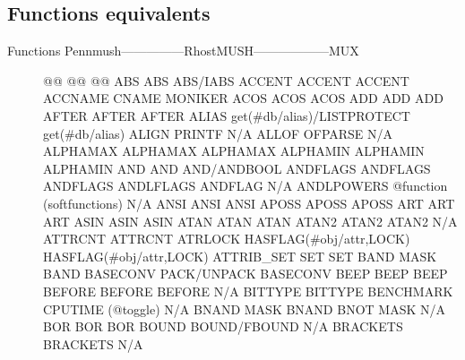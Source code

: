 \documentclass[letterpaper,10pt,english]{sphinxmanual}
\begin{document}
\subsection{Functions equivalents}
\label{\detokenize{differences:functions-equivalents}}\begin{description}
\item[{Functions Pennmush—————\sphinxhyphen{}RhostMUSH——————\textendash{}MUX}] \leavevmode
\sphinxAtStartPar
@@                      @@                           @@
ABS                     ABS                          ABS/IABS
ACCENT                  ACCENT                       ACCENT
ACCNAME                 CNAME                        MONIKER
ACOS                    ACOS                         ACOS
ADD                     ADD                          ADD
AFTER                   AFTER                        AFTER
ALIAS                   get(\#db/alias)/LISTPROTECT   get(\#db/alias)
ALIGN                   PRINTF                       N/A
ALLOF                   OFPARSE                      N/A
ALPHAMAX                ALPHAMAX                     ALPHAMAX
ALPHAMIN                ALPHAMIN                     ALPHAMIN
AND                     AND                          AND/ANDBOOL
ANDFLAGS                ANDFLAGS                     ANDFLAGS
ANDLFLAGS               ANDFLAG                      N/A
ANDLPOWERS              @function (softfunctions)    N/A
ANSI                    ANSI                         ANSI
APOSS                   APOSS                        APOSS
ART                     ART                          ART
ASIN                    ASIN                         ASIN
ATAN                    ATAN                         ATAN
ATAN2                   ATAN2                        ATAN2
N/A                     ATTRCNT                      ATTRCNT
ATRLOCK                 HASFLAG(\#obj/attr,LOCK)      HASFLAG(\#obj/attr,LOCK)
ATTRIB\_SET              SET                          SET
BAND                    MASK                         BAND
BASECONV                PACK/UNPACK                  BASECONV
BEEP                    BEEP                         BEEP
BEFORE                  BEFORE                       BEFORE
N/A                     BITTYPE                      BITTYPE
BENCHMARK               CPUTIME (@toggle)            N/A
BNAND                   MASK                         BNAND
BNOT                    MASK                         N/A
BOR                     BOR                          BOR
BOUND                   BOUND/FBOUND                 N/A
BRACKETS                BRACKETS                     N/A

\end{description}
\end{document}
